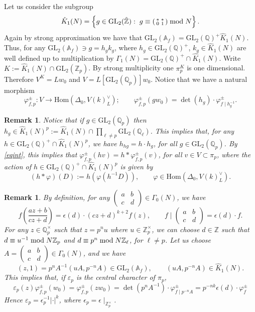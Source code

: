 \documentclass{amsart}
\newtheorem{remark0}[defn0]{Remark}
\newenvironment{remark}{\begin{remark0}\rm}{\end{remark0}}
\newcommand{\GL}{{\mathrm{GL}}}
\newcommand{\Z}{{\mathbb Z}}
\newcommand{\A}{{\mathbb A}}
\newcommand{\Q}{{\mathbb Q}}
\newcommand{\Hom}{{\mathrm {Hom}}}
\begin{document}
Let us consider the subgroup
\[
\hat K_1(N)=\left\{g\in \GL_2(\hat \Z):\;g\equiv(\begin{smallmatrix}\ast&\ast\\0&1\end{smallmatrix})\;{\rm mod}\;N\right\}.
\]
Again by strong approximation we have that $\GL_2(\A_f)=\GL_2(\Q)^+\hat K_1(N)$.
Thus, for any $\GL_2(\A_f)\ni g=h_gk_g$, where $h_g\in \GL_2(\Q)^+$, $k_g\in \hat K_1(N)$ are well defined up to multiplication by $\Gamma_1(N)=\GL_2(\Q)^+\cap\hat K_1(N)$.
Write $K:=\hat K_1(N)\cap\GL_2(\Z_p)$. By strong multiplicity one $\pi_p^K$ is one dimensional. Therefore $V^K=Lw_0$ and $V=L[\GL_2(\Q_p)]w_0$.
Notice that we have a natural morphism 
\[
\varphi_{f,p}^\pm:V\longrightarrow\Hom(\Delta_0,V(k)_L^\vee);\qquad \varphi_{f,p}^\pm(gw_0)=\det(h_g)\cdot
\varphi_{f\mid h_g^{-1}}^\pm.
\] 
\begin{remark}\label{rmkacthom}
Notice that if $g\in\GL_2(\Q_p)$ then $h_g\in \hat K_1(N)^p:=\hat K_1(N)\cap\prod_{\ell\neq p}\GL_2(\Q_\ell)$. This implies that, for any $h\in \GL_2(\Q)^+\cap\hat K_1(N)^p$, we have $h_{hg}=h\cdot h_g$, for all $g\in\GL_2(\Q_p)$.
By \eqref{eqint}, this implies that $\varphi_{f,p}^\pm(hv)=h\ast\varphi_{f,p}^\pm(v)$, for all $v\in V\subset\pi_p$, where the action of $h\in \GL_2(\Q)^+\cap\hat K_1(N)^p$ is given by 
\[
(h\ast\varphi)(D):=h(\varphi(h^{-1}D)),\qquad\varphi\in \Hom(\Delta_0,V(k)_L^\vee).
\]
\end{remark}
\begin{remark}\label{rmkchar}
By definition, for any $\left(\begin{smallmatrix}a&b\\c&d\end{smallmatrix}\right)\in\Gamma_0(N)$, we have 
\[
f\left(\frac{az+b}{cz+d}\right)=\epsilon(d)\cdot(cz+d)^{k+2}f(z),\qquad f\mid\left(\begin{smallmatrix}a&b\\c&d\end{smallmatrix}\right)=\epsilon(d)\cdot  f.
\]
For any $z\in \Q_p^\times$ such that $z=p^nu$ where $u\in\Z_p^\times$, we can choose $d\in\Z$ such that $d\equiv u^{-1}\;{\rm mod}\;N\Z_p$ and $d\equiv p^{n}\;{\rm mod}\;N\Z_\ell$, for $\ell\neq p$. Let us choose $A=(\begin{smallmatrix}a&b\\c&d\end{smallmatrix})\in\Gamma_0(N)$, and we have  
\[
(z,1)=p^nA^{-1}(uA,p^{-n}A)\in\GL_2(\A_f),\qquad (uA,p^{-n}A)\in\hat K_1(N).
\]
This implies that, if $\varepsilon_p$ is the central character of $\pi_p$, 
\[
\varepsilon_p(z)\varphi_{f,p}^\pm(w_0)=\varphi_{f,p}^\pm(zw_0)=\det(p^nA^{-1})\cdot\varphi_{f\mid p^{-n}A}^\pm=p^{-nk}\epsilon(d)\cdot\varphi_{f}^\pm
\]
Hence $\varepsilon_p=\epsilon_p^{-1}|\cdot|^k$, where $\epsilon_p=\epsilon\mid_{\Z_p^\times}$.
\end{remark}
\end{document}
